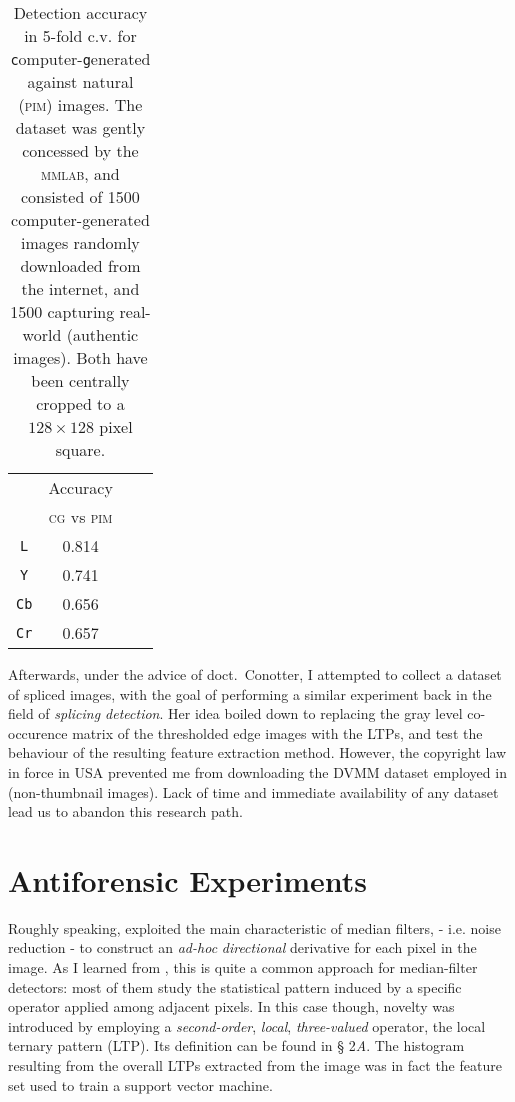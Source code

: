 \documentclass[10pt,a4paper]{report}
\newcommand{\code}[1]{\texttt{#1}}
\begin{document}
\begin{SCtable}[3.0][h!]
  \centering
  \caption{Detection accuracy in 5-fold c.v. for \code{c}omputer-\code{g}enerated  against
    natural (\textsc{pim}) images. The dataset was gently
    concessed by the \textsc{mmlab}, and consisted of 1500  computer-generated
    images randomly downloaded from the internet, and 1500 capturing
    real-world (authentic images). Both have been centrally cropped to a
    $128 \times 128$ pixel square.}

  \begin{tabular}{c|ccc}
    & \small{Accuracy} \\ & \textsc{cg} vs \textsc{pim} \\
    \hline
    \code{L}  & 0.814 \\
    \code{Y}  & 0.741 \\
    \code{Cb} & 0.656 \\
    \code{Cr} & 0.657 \\
  \end{tabular}
\end{SCtable}

Afterwards, under the advice of doct.~Conotter, I attempted to collect a dataset of spliced
images, with the goal of performing a similar experiment back in the field of
\emph{splicing detection}. Her idea boiled down to replacing the gray level
co-occurence matrix of the thresholded edge images with the LTPs, and test the
behaviour of the resulting feature extraction method.
However, the copyright law in force in
USA prevented me from downloading the DVMM dataset
employed in \cite{splicing} (non-thumbnail images). Lack of time and
immediate availability of any dataset lead us to abandon this research path.

\section{Antiforensic Experiments}

Roughly speaking, \cite{mediantraces} exploited the main characteristic of
median filters, - i.e. noise reduction - to construct an \emph{ad-hoc}
\emph{directional} derivative for each pixel in the image.
As I learned from \cite{antiforensic}, this is quite a common approach for
median-filter detectors: most of them study the statistical pattern induced by a
specific operator applied among adjacent pixels.
In this case though, novelty was introduced by employing a \emph{second-order},
\emph{local}, \emph{three-valued} operator, the local ternary pattern (LTP).
 Its definition can be found in \cite{mediantraces} \S
2\textit{A}. The histogram resulting from the overall LTPs extracted from the
image was in fact the feature set used to train a support vector machine.
\end{document}
